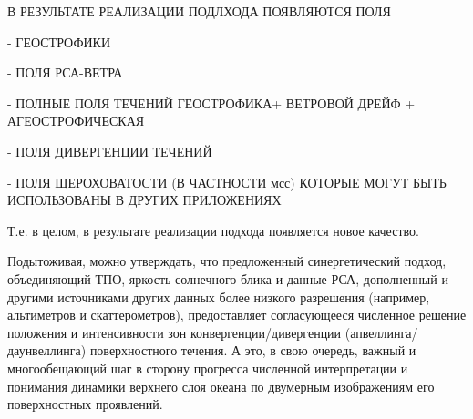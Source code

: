 В РЕЗУЛЬТАТЕ РЕАЛИЗАЦИИ ПОДЛХОДА ПОЯВЛЯЮТСЯ ПОЛЯ



- ГЕОСТРОФИКИ

- ПОЛЯ РСА-ВЕТРА

- ПОЛНЫЕ ПОЛЯ ТЕЧЕНИЙ ГЕОСТРОФИКА+ ВЕТРОВОЙ ДРЕЙФ + АГЕОСТРОФИЧЕСКАЯ 

- ПОЛЯ ДИВЕРГЕНЦИИ ТЕЧЕНИЙ

- ПОЛЯ ЩЕРОХОВАТОСТИ (В ЧАСТНОСТИ мсс) КОТОРЫЕ МОГУТ БЫТЬ ИСПОЛЬЗОВАНЫ В ДРУГИХ ПРИЛОЖЕНИЯХ

Т.е. в целом, в результате реализации подхода появляется новое качество. 

Подытоживая, можно утверждать, что предложенный синергетический подход, объединяющий ТПО, яркость солнечного блика и данные РСА, дополненный и другими источниками других данных более низкого разрешения (например, альтиметров и скаттерометров), предоставляет согласующееся численное решение положения и интенсивности зон конвергенции/дивергенции (апвеллинга/даунвеллинга) поверхностного течения. А это, в свою очередь, важный и многообещающий шаг в сторону прогресса численной интерпретации и понимания динамики верхнего слоя океана по двумерным изображениям его поверхностных проявлений.



\clearpage